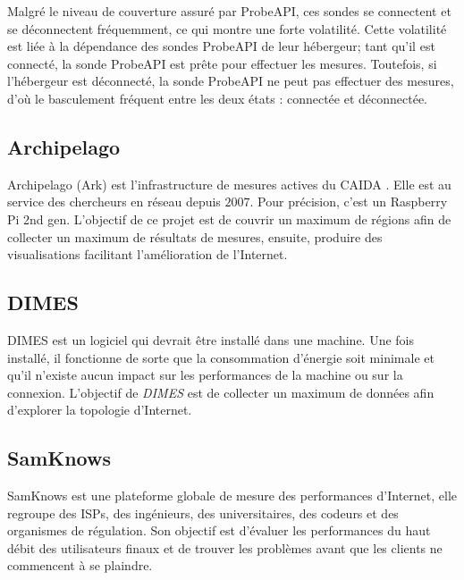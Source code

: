 Malgré le niveau de couverture assuré par ProbeAPI, ces sondes se connectent et se déconnectent fréquemment, ce qui montre une forte volatilité. Cette volatilité est liée à la dépendance des sondes ProbeAPI de leur hébergeur; tant qu'il est connecté, la sonde ProbeAPI est prête pour effectuer les mesures. Toutefois, si l'hébergeur est déconnecté, la sonde ProbeAPI ne peut pas effectuer des mesures, d'où le basculement fréquent entre les deux états : connectée et déconnectée. 

\subsection{Archipelago}

Archipelago (Ark) \cite{Archipelago} est l'infrastructure de mesures actives du CAIDA \cite{CAIDA}. Elle est au service des chercheurs en réseau depuis $2007$. Pour précision, c'est un Raspberry Pi 2nd gen. L'objectif de ce projet est de couvrir un maximum de régions afin de collecter un maximum de résultats de mesures, ensuite, produire des visualisations facilitant l'amélioration  de l'Internet. 


\subsection{DIMES}
DIMES \cite{Shavitt:2005:DLI:1096536.1096546} est un logiciel qui devrait être installé dans une machine. Une fois installé, il fonctionne de sorte que la consommation d'énergie soit minimale et qu'il n'existe aucun impact sur les performances de la machine ou sur la connexion. L'objectif de \textit{DIMES} est de collecter un maximum de données afin d'explorer la topologie d'Internet.


\subsection{SamKnows}
SamKnows \cite{SamKnows}  est une plateforme globale de mesure des performances d'Internet, elle regroupe des ISPs, des ingénieurs, des universitaires, des codeurs et des organismes de régulation. Son objectif est d'évaluer les performances du haut débit des utilisateurs finaux et de trouver les problèmes avant que les clients ne commencent à se plaindre. 

